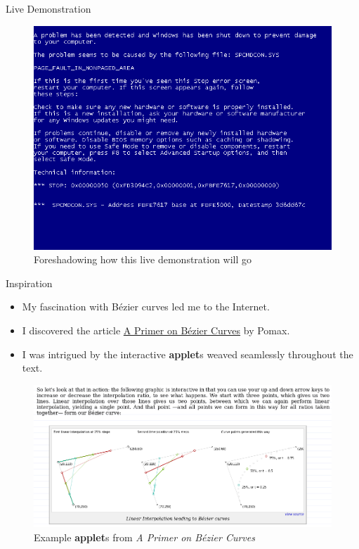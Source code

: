 \documentclass{beamer}
\begin{document}
\begin{frame}{Live Demonstration}
    \begin{figure}
        \begin{center}
            \includegraphics[scale=0.4]{images/bsod.png}
        \end{center}
        \caption{Foreshadowing how this live demonstration will go}
    \end{figure}
\end{frame}

\begin{frame}{Inspiration}
    \begin{itemize}
        \item My fascination with Bézier curves led me to the Internet.
        \item I discovered the article
            \href{https://pomax.github.io/bezierinfo/}{A Primer on Bézier
            Curves} by Pomax.
        \item I was intrigued by the interactive \textbf{applet}s weaved
            seamlessly throughout the text.
    \end{itemize}
    \begin{figure}
        \begin{center}
            \includegraphics[scale=0.25]{images/pomax.png}
        \end{center}
        \caption{Example \textbf{applet}s from \textit{A Primer on Bézier
        Curves}}
    \end{figure}
\end{frame}
\end{document}
